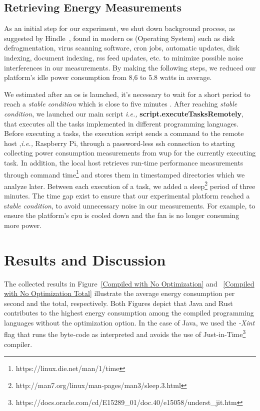 \subsection{Retrieving Energy Measurements} 
As an initial step for our experiment, we shut down background 
process, as suggested by Hindle~, 
found in modern {\sc os} (Operating System) such as disk defragmentation, virus 
scanning software, {\sc cron} jobs, automatic updates, 
disk indexing, document indexing, {\sc rss} feed updates, etc. to 
minimize possible noise interferences in our measurements. 
By making the following steps, we reduced our platform's idle 
power consumption from 8,6 to 5.8 watts in average. 


We estimated after an {\sc os} is launched, 
it's necessary to wait for a short period to reach a 
\textit{stable condition} which is close to five minutes \cite{carroll_analysis_2010}.
After reaching \textit{stable condition}, we launched our main 
script \textit{i.e.,} \textbf{script.executeTasksRemotely}, 
that executes all the tasks implemented in different programming 
languages. 
Before executing a tasks, the execution script sends a command 
to the remote host ,\textit{i.e.,} Raspberry Pi, through a 
password-less {\sc ssh} connection to starting 
collecting power consumption measurements from {\sc wup} 
for the currently executing task. 
In addition, the local host retrieves run-time performance 
measurements through command 
time\footnote{https://linux.die.net/man/1/time} and stores them 
in timestamped directories which we analyze later.
Between each execution of a task, we added a 
sleep\footnote{http://man7.org/linux/man-pages/man3/sleep.3.html} 
period of three minutes. 
The time gap exist to ensure that our experimental platform 
reached a s\textit{table condition}, to avoid unnecessary noise 
in our measurements. 
For example, to ensure the platform's {\sc cpu} is cooled down 
and the fan is no longer consuming more power.

\section{Results and Discussion} \label{results_and_discussion}
The collected results in Figure~\ref{Compiled with No Optimization} 
and ~\ref{Compiled with No Optimization Total} illustrate the 
average energy consumption per second and the total, respectively.
Both Figures depict that Java and Rust contributes to the highest 
energy consumption among the compiled programming languages without 
the optimization option. 
In the case of Java, we used the \textit{-Xint} flag that runs 
the byte-code as interpreted and avoids the use of 
Just-in-Time\footnote{https://docs.oracle.com/cd/E15289\_01/doc.40/e15058/underst\_jit.htm} 
compiler. 

